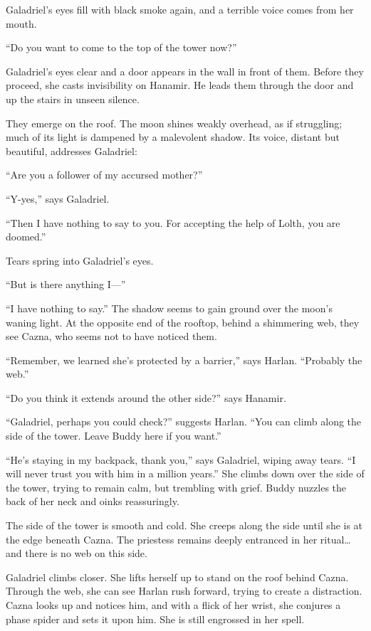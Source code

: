 \documentclass[smalldemyvopaper,11pt,twoside,onecolumn,openright,extrafontsizes]{memoir}
\begin{document}
Galadriel's eyes fill with black smoke again, and a terrible voice comes
from her mouth.

``Do you want to come to the top of the tower now?''

Galadriel's eyes clear and a door appears in the wall in front of them.
Before they proceed, she casts invisibility on Hanamir. He leads them
through the door and up the stairs in unseen silence.

They emerge on the roof. The moon shines weakly overhead, as if
struggling; much of its light is dampened by a malevolent shadow. Its
voice, distant but beautiful, addresses Galadriel:

``Are you a follower of my accursed mother?''

``Y-yes,'' says Galadriel.

``Then I have nothing to say to you. For accepting the help of Lolth,
you are doomed.''

Tears spring into Galadriel's eyes.

``But is there anything I---''

``I have nothing to say.'' The shadow seems to gain ground over the
moon's waning light. At the opposite end of the rooftop, behind a
shimmering web, they see Cazna, who seems not to have noticed them.

``Remember, we learned she's protected by a barrier,'' says Harlan.
``Probably the web.''

``Do you think it extends around the other side?'' says Hanamir.

``Galadriel, perhaps you could check?'' suggests Harlan. ``You can climb
along the side of the tower. Leave Buddy here if you want.''

``He's staying in my backpack, thank you,'' says Galadriel, wiping away
tears. ``I will never trust you with him in a million years.'' She
climbs down over the side of the tower, trying to remain calm, but
trembling with grief. Buddy nuzzles the back of her neck and oinks
reassuringly.

The side of the tower is smooth and cold. She creeps along the side
until she is at the edge beneath Cazna. The priestess remains deeply
entranced in her ritual\ldots{} and there is no web on this side.

Galadriel climbs closer. She lifts herself up to stand on the roof
behind Cazna. Through the web, she can see Harlan rush forward, trying
to create a distraction. Cazna looks up and notices him, and with a
flick of her wrist, she conjures a phase spider and sets it upon him.
She is still engrossed in her spell.
\end{document}
